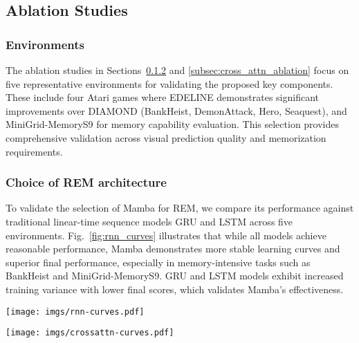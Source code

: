 \subsection{Ablation Studies}
\label{subsec:ablation_studies}

\subsubsection{Environments}
The ablation studies in Sections~\ref{subsec:rem_ablation} and \ref{subsec:cross_attn_ablation} focus on five representative environments for validating the proposed key components. These include four Atari games where EDELINE demonstrates significant improvements over DIAMOND (BankHeist, DemonAttack, Hero, Seaquest), and MiniGrid-MemoryS9 for memory capability evaluation. This selection provides comprehensive validation across visual prediction quality and memorization requirements. 

\subsubsection{Choice of REM architecture}
\label{subsec:rem_ablation}
To validate the selection of Mamba for REM, we compare its performance against traditional linear-time sequence models GRU and LSTM across five environments. Fig.~\ref{fig:rnn_curves} illustrates that while all models achieve reasonable performance, Mamba demonstrates more stable learning curves and superior final performance, especially in memory-intensive tasks such as BankHeist and MiniGrid-MemoryS9. GRU and LSTM models exhibit increased training variance with lower final scores, which validates Mamba's effectiveness.

\begin{figure*}[ht]
    \centering
    \texttt{[image: imgs/rnn-curves.pdf]}
    \caption{Performance comparison of different linear-time sequence models as REM architecture across five environments. Training curves show mean and standard deviation over three seeds. Mamba (\textcolor{red}{red}) shows more stable training progression and superior final performance compared to GRU (\textcolor{blue}{blue}) and LSTM (\textcolor{green}{green}).}
    \label{fig:rnn_curves}
\end{figure*}


\begin{figure*}[ht]
    \centering
    \texttt{[image: imgs/crossattn-curves.pdf]}
    \caption{Ablation study comparing EDELINE with cross-attention blocks (\textcolor{blue}{blue}) and without (\textcolor{green}{green}) across five test environments. Training curves depict mean and standard deviation over three seeds. EDELINE's cross-attention mechanism provides advantages in environments requiring rich contextual information processing.}
    \label{fig:cross_attn_curves}
\end{figure*}

